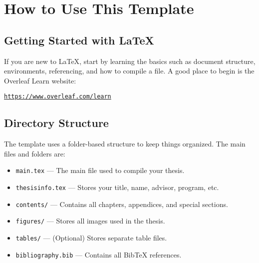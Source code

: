 \documentclass{VISTEC}
\begin{document}
 

\chapter*{How to Use This Template}
\label{manual}

\section{Getting Started with {\LaTeX}}
\label{manual:latex-getting-started}

\begin{paragraph}
If you are new to {\LaTeX}, start by learning the basics such as document structure, environments, referencing, and how to compile a file. A good place to begin is the Overleaf Learn website:
\end{paragraph}

\begin{center}
\href{https://www.overleaf.com/learn}{\texttt{https://www.overleaf.com/learn}}
\end{center}

\section{Directory Structure}
\label{manual:directory-structure}

\begin{paragraph}
The template uses a folder-based structure to keep things organized. The main files and folders are:
\end{paragraph}

\begin{itemize}[leftmargin=\paritemindent]
    \item \texttt{main.tex} — The main file used to compile your thesis.
    \item \texttt{thesisinfo.tex} — Stores your title, name, advisor, program, etc.
    \item \texttt{contents/} — Contains all chapters, appendices, and special sections.
    \item \texttt{figures/} — Stores all images used in the thesis.
    \item \texttt{tables/} — (Optional) Stores separate table files.
    \item \texttt{bibliography.bib} — Contains all BibTeX references.
\end{itemize}
\end{document}
